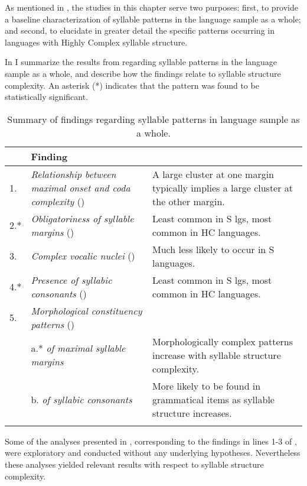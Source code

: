   As mentioned in , the studies in this chapter serve two purposes: first, to provide a baseline characterization of syllable patterns in the language sample as a whole; and second, to elucidate in greater detail the specific patterns occurring in languages with Highly Complex syllable structure.

  In  I summarize the results from  regarding syllable patterns in the language sample as a whole, and describe how the findings relate to syllable structure complexity. An asterisk (*) indicates that the pattern was found to be statistically significant.

\begin{table}
\begin{tabularx}{\textwidth}{l@{ }QQ}
\lsptoprule
{} & {Finding}\\\midrule
{1.}  & \textit{Relationship between maximal onset and coda complexity} () & A large cluster at one margin typically implies a large cluster at the other margin.\\
{2.*} & \textit{Obligatoriness of syllable margins} () & Least common in S lgs, most common in HC languages.\\
{3.}  & \textit{Complex vocalic nuclei} () & Much less likely to occur in S languages.\\
{4.*} & \textit{Presence of syllabic consonants} () & Least common in S lgs, most common in HC languages.\\
{5.}  & \textit{Morphological constituency patterns} () & \\
      & {a.*} \textit{of maximal syllable margins} & Morphologically complex patterns increase with syllable structure complexity.\\
      & {b.} \textit{of syllabic consonants} &  More likely to be found in grammatical items as syllable structure increases.\\
\lspbottomrule
\end{tabularx}
\caption{\label{tab:3.18}Summary of findings regarding syllable patterns in language sample as a whole.}
\end{table}

Some of the analyses presented in , corresponding to the findings in lines 1-3 of , were exploratory and conducted without any underlying hypotheses. Nevertheless these analyses yielded relevant results with respect to syllable structure complexity.

